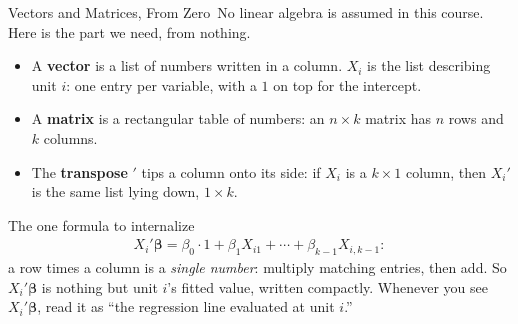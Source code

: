 \documentclass[aspectratio=169,11pt,xcolor=dvipsnames]{beamer}
\newcommand{\core}{\,\raisebox{0.6pt}{\textcolor{corestar}{$\bigstar$}}}
\begin{document}
\begin{frame}{Vectors and Matrices, From Zero\core}
No linear algebra is assumed in this course. Here is the part we need, from
nothing.
\begin{itemize}\itemsep3pt
  \item A \textbf{vector} is a list of numbers written in a column. $X_i$ is the
        list describing unit $i$: one entry per variable, with a $1$ on top for
        the intercept.
  \item A \textbf{matrix} is a rectangular table of numbers: an $n\times k$
        matrix has $n$ rows and $k$ columns.
  \item The \textbf{transpose} $'$ tips a column onto its side: if $X_i$ is a
        $k\times 1$ column, then $X_i'$ is the same list lying down, $1\times k$.
\end{itemize}
\vskip2pt
\begin{block}{The one formula to internalize}
\begin{align*}
  X_i'\bm\beta = \beta_0\cdot 1 + \beta_1 X_{i1} + \cdots + \beta_{k-1}X_{i,k-1} :
\end{align*}
a row times a column is a \emph{single number}: multiply matching entries, then
add. So $X_i'\bm\beta$ is nothing but unit $i$'s fitted value, written
compactly. Whenever you see $X_i'\bm\beta$, read it as ``the regression line
evaluated at unit $i$.''
\end{block}
\end{frame}
\end{document}
